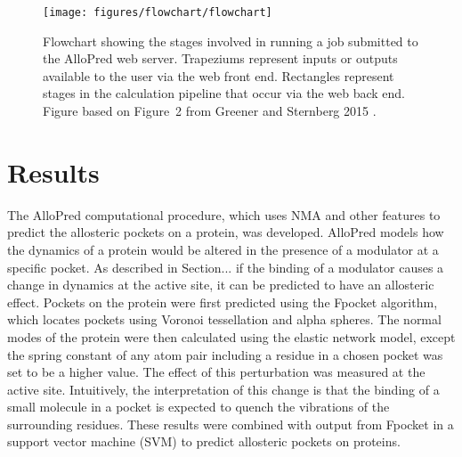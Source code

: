 \begin{figure}
\centering

\texttt{[image: figures/flowchart/flowchart]}

\caption{Flowchart showing the stages involved in running a job submitted to the AlloPred web server.
Trapeziums represent inputs or outputs available to the user via the web front end.
Rectangles represent stages in the calculation pipeline that occur via the web back end.
Figure based on Figure~2 from Greener and Sternberg 2015 \cite{Greener2015}.}

\label{fig:flowchart}
\end{figure}


\section{Results}
\label{sec:allopred_results}

The AlloPred computational procedure, which uses NMA and other features to predict the allosteric pockets on a protein, was developed.
AlloPred models how the dynamics of a protein would be altered in the presence of a modulator at a specific pocket.
As described in Section... if the binding of a modulator causes a change in dynamics at the active site, it can be predicted to have an allosteric effect.
Pockets on the protein were first predicted using the Fpocket \cite{LeGuilloux2009} algorithm, which locates pockets using Voronoi tessellation and alpha spheres.
The normal modes of the protein were then calculated using the elastic network model, except the spring constant of any atom pair including a residue in a chosen pocket was set to be a higher value.
The effect of this perturbation was measured at the active site.
Intuitively, the interpretation of this change is that the binding of a small molecule in a pocket is expected to quench the vibrations of the surrounding residues.
These results were combined with output from Fpocket in a support vector machine (SVM) to predict allosteric pockets on proteins.

